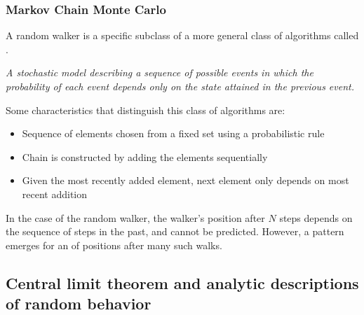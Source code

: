 \documentclass[hyperref={colorlinks=true}]{beamer}
\begin{document}
\begin{frame}%
  \frametitle{Markov Chain Monte Carlo}
  
  A random walker is a specific subclass of a more general class of algorithms called . 
  
  \begin{center}
    \textit{A stochastic model describing a sequence of possible events in which the probability of each event depends only on the state attained in the previous event.}
  \end{center}
  
  \vspace{0.2cm} 
  
  Some characteristics that distinguish this class of algorithms are:   
  
  \begin{itemize}
    \item Sequence of elements chosen from a fixed set using a probabilistic rule
    \item Chain is constructed by adding the elements sequentially
    \item Given the most recently added element, next element only depends on most recent addition
  \end{itemize}
  
  In the case of the random walker, the walker's position after $N$ steps depends on the sequence of steps in the past, and cannot be predicted. However, a pattern emerges for an  of positions after many such walks.
  
\end{frame}

\subsection[Central limit theorem and analytic descriptions of random behavior]{Central limit theorem and analytic descriptions of random behavior}
\end{document}
